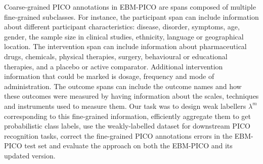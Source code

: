 \documentclass[10.7pt,]{article}
\begin{document}
Coarse-grained PICO annotations in EBM-PICO are spans composed of multiple fine-grained subclasses.
For instance, the participant span can include information about different participant characteristics: disease, disorder, symptoms, age, gender, the sample size in clinical studies, ethnicity, language or geographical location.
The intervention span can include information about pharmaceutical drugs, chemicals, physical therapies, surgery, behavioural or educational therapies, and a placebo or active comparator.
Additional intervention information that could be marked is dosage, frequency and mode of administration.
The outcome spans can include the outcome names and how these outcomes were measured by having information about the scales, techniques and instruments used to measure them.
Our task was to design weak labellers $\lambda^{m}$ corresponding to this fine-grained information, efficiently aggregate them to get probabilistic class labels, use the weakly-labelled dataset for downstream PICO recognition tasks, correct the fine-grained PICO annotations errors in the EBM-PICO test set and evaluate the approach on both the EBM-PICO and its updated version.

%
%
%
\end{document}
